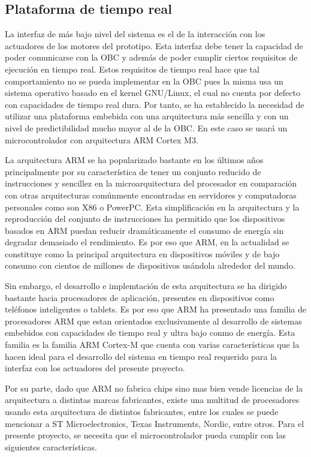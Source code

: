    \subsection{Plataforma de tiempo real}\label{sec:mcu}
    La interfaz de más bajo nivel del sistema es el de la interacción con los actuadores de los motores del prototipo. Esta 
    interfaz debe tener la capacidad de poder comunicarse con la OBC y además de poder cumplir ciertos requisitos de ejecución 
    en tiempo real. Estos requisitos de tiempo real hace que tal comportamiento no se pueda implementar en la OBC pues la misma 
    usa un sistema operativo basado en el kernel GNU/Linux, el cual no cuenta por defecto con capacidades de tiempo real dura. 
    Por tanto, se ha establecido la necesidad de utilizar una plataforma embebida con una arquitectura más sencilla y con un 
    nivel de predictibilidad mucho mayor al de la OBC. En este caso se usará un microcontrolador con arquitectura ARM Cortex M3.

    La arquitectura ARM se ha popularizado bastante en los últimos años principalmente por su característica de tener un conjunto 
    reducido de instrucciones y sencillez en la microarquitectura del procesador en comparación con otras arquitecturas comúnmente 
    encontradas en servidores y computadoras personales como son X86 o PowerPC. Esta simplificación en la arquitectura y la reproducción
    del conjunto de instrucciones ha permitido que los dispositivos basados en ARM puedan reducir dramáticamente el consumo de 
    energía sin degradar demasiado el rendimiento. Es por eso que ARM, en la actualidad se constituye como la principal arquitectura en 
    dispositivos móviles y de bajo consumo con cientos de millones de dispositivos usándola alrededor del mundo.

    Sin embargo, el desarrollo e implemtación de esta arquitectura se ha dirigido bastante hacia procesadores de aplicación, presentes
    en dispositivos como teléfonos inteligentes o tablets. Es por eso que ARM ha presentado una familia de procesadores ARM que estan
    orientados exclusivamente al desarrollo de sistemas embebidos con capacidades de tiempo real y ultra bajo conmo de energía. Esta 
    familia es la familia ARM Cortex-M que cuenta con varias características que la hacen ideal para el desarrollo del sistema en tiempo 
    real requerido para la interfaz con los actuadores del presente proyecto.

    Por su parte, dado que ARM no fabrica chips sino mas bien vende licencias de la arquitectura a distintas marcas fabricantes, existe 
    una multitud de procesadores usando esta arquitectura de distintos fabricantes, entre los cuales se puede mencionar a ST Microelectronics,
    Texas Instruments, Nordic, entre otros. Para el presente proyecto, se necesita que el microcontrolador pueda cumplir con las 
    siguientes características. 

